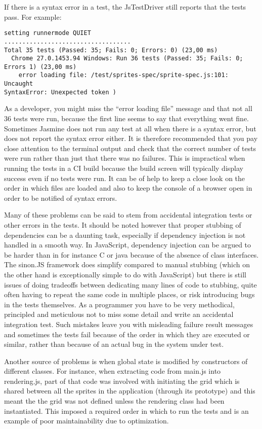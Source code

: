 \documentclass[11pt]{article}
\begin{document}
If there is a syntax error in a test, the JsTestDriver still reports that the tests pass. For example:

\begin{verbatim}
setting runnermode QUIET
...................................
Total 35 tests (Passed: 35; Fails: 0; Errors: 0) (23,00 ms)
  Chrome 27.0.1453.94 Windows: Run 36 tests (Passed: 35; Fails: 0;
Errors 1) (23,00 ms)
    error loading file: /test/sprites-spec/sprite-spec.js:101: Uncaught
SyntaxError: Unexpected token )
\end{verbatim}

As a developer, you might miss the ``error loading file'' message and that not all 36 tests were run, because the first line seems to say that everything went fine. Sometimes Jasmine does not run any test at all when there is a syntax error, but does not report the syntax error either. It is therefore recommended that you pay close attention to the terminal output and check that the correct number of tests were run rather than just that there was no failures. This is impractical when running the tests in a CI build because the build screen will typically display success even if no tests were run. It can be of help to keep a close look on the order in which files are loaded and also to keep the console of a browser open in order to be notified of syntax errors\cite{MikeJansen}.

Many of these problems can be said to stem from accidental integration tests or other errors in the tests. It should be noted however that proper stubbing of dependencies can be a daunting task, especially if dependency injection is not handled in a smooth way. In JavaScript, dependency injection can be argued to be harder than in for instance C or java because of the absence of class interfaces. The sinon.JS framework does simplify compared to manual stubbing (which on the other hand is exceptionally simple to do with JavaScript) but there is still issues of doing tradeoffs between dedicating many lines of code to stubbing, quite often having to repeat the same code in multiple places, or risk introducing bugs in the tests themselves. As a programmer you have to be very methodical, principled and meticulous not to miss some detail and write an accidental integration test. Such mistakes leave you with misleading failure result messages and sometimes the tests fail because of the order in which they are executed or similar, rather than because of an actual bug in the system under test.

Another source of problems is when global state is modified by constructors of different classes. For instance, when extracting code from main.js into rendering.js, part of that code was involved with initiating the grid which is shared between all the sprites in the application (through its prototype) and this meant the the grid was not defined unless the rendering class had been instantiated. This imposed a required order in which to run the tests and is an example of poor maintainability due to optimization.
\end{document}

